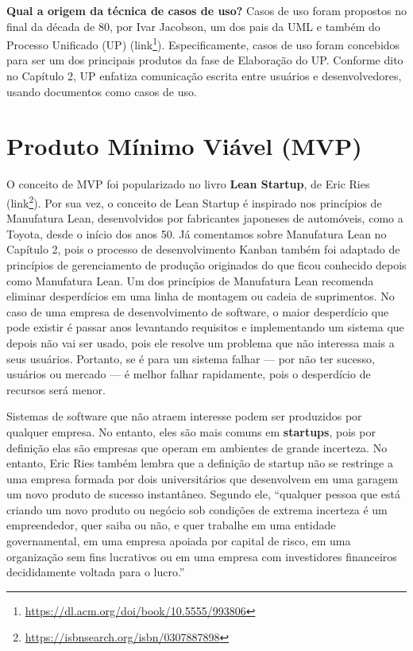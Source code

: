 \documentclass[
  11pt,
  twoside]{book}
\DeclareRobustCommand{\href}[2]{#2\footnote{\url{#1}}}
\begin{document}
\textbf{Qual a origem da técnica de casos de uso?} Casos de uso foram
propostos no final da década de 80, por Ivar Jacobson, um dos pais da
UML e também do Processo Unificado (UP)
(\href{https://dl.acm.org/doi/book/10.5555/993806}{link}).
Especificamente, casos de uso foram concebidos para ser um dos
principais produtos da fase de Elaboração do UP. Conforme dito no
Capítulo 2, UP enfatiza comunicação escrita entre usuários e
desenvolvedores, usando documentos como casos de uso.

\hypertarget{produto-muxednimo-viuxe1vel-mvp}{%
\section{Produto Mínimo Viável
(MVP)}\label{produto-muxednimo-viuxe1vel-mvp}}

  
  
 O conceito de MVP foi popularizado no livro
\textbf{Lean Startup}, de Eric Ries
(\href{https://isbnsearch.org/isbn/0307887898}{link}). Por sua vez, o
conceito de Lean Startup é inspirado nos princípios de Manufatura Lean,
desenvolvidos por fabricantes japoneses de automóveis, como a Toyota,
desde o início dos anos 50. Já comentamos sobre Manufatura Lean no
Capítulo 2, pois o processo de desenvolvimento Kanban também foi
adaptado de princípios de gerenciamento de produção originados do que
ficou conhecido depois como Manufatura Lean. Um dos princípios de
Manufatura Lean recomenda eliminar desperdícios em uma linha de montagem
ou cadeia de suprimentos. No caso de uma empresa de desenvolvimento de
software, o maior desperdício que pode existir é passar anos levantando
requisitos e implementando um sistema que depois não vai ser usado, pois
ele resolve um problema que não interessa mais a seus usuários.
Portanto, se é para um sistema falhar --- por não ter sucesso, usuários
ou mercado --- é melhor falhar rapidamente, pois o desperdício de
recursos será menor.

Sistemas de software que não atraem interesse podem ser produzidos por
qualquer empresa. No entanto, eles são mais comuns em \textbf{startups},
pois por definição elas são empresas que operam em ambientes de grande
incerteza. No entanto, Eric Ries também lembra que a definição de
startup não se restringe a uma empresa formada por dois universitários
que desenvolvem em uma garagem um novo produto de sucesso instantâneo.
Segundo ele, ``qualquer pessoa que está criando um novo produto ou
negócio sob condições de extrema incerteza é um empreendedor, quer saiba
ou não, e quer trabalhe em uma entidade governamental, em uma empresa
apoiada por capital de risco, em uma organização sem fins lucrativos ou
em uma empresa com investidores financeiros decididamente voltada para o
lucro.''
\end{document}
